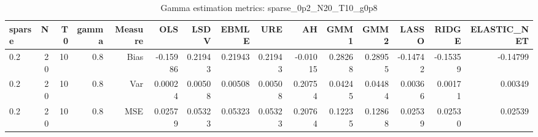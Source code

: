 \begin{table}[!htbp]\centering
\caption{Gamma estimation metrics: sparse_0p2_N20_T10_g0p8}
\label{tab:table1_sparse_0p2_N20_T10_g0p8}
\begin{tabular}{lrrrrrrrrrrrrrr}
\hline
sparse & N & T0 & gamma & Measure & OLS & LSDV & EBMLE & URE & AH & GMM1 & GMM2 & LASSO & RIDGE & ELASTIC_NET \\
\hline
0.2 & 20 & 10 & 0.8 & Bias & -0.15986 & 0.21943 & 0.21943 & 0.21943 & -0.01015 & 0.28268 & 0.28955 & -0.14742 & -0.15359 & -0.14799 \\
0.2 & 20 & 10 & 0.8 & Var & 0.00024 & 0.00508 & 0.00508 & 0.00508 & 0.20754 & 0.04245 & 0.04484 & 0.00366 & 0.00171 & 0.00349 \\
0.2 & 20 & 10 & 0.8 & MSE & 0.02579 & 0.05323 & 0.05323 & 0.05323 & 0.20764 & 0.12235 & 0.12868 & 0.02539 & 0.02530 & 0.02539 \\
\hline
\end{tabular}
\end{table}

